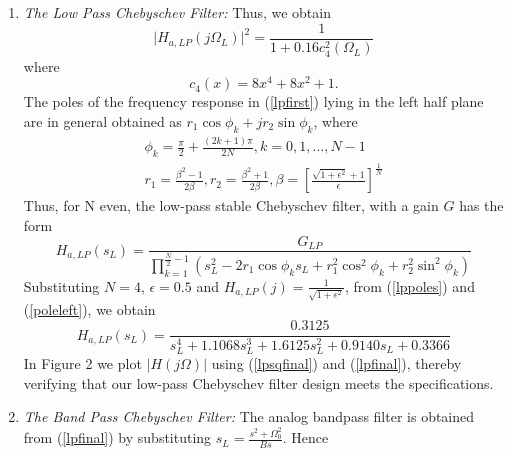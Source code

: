 \documentclass[journal,12pt,twocolumn]{IEEEtran}
\begin{document}
\begin{enumerate}

\item {\em The Low Pass Chebyschev Filter:} Thus, we obtain
\begin{equation}
\label{lpsqfinal}
\vert H_{a,LP}(j\Omega_L)\vert^2 = \frac{1}{1 + 0.16c_4^2(\Omega_L)}
\end{equation}
where
\begin{equation}
c_4(x) = 8x^4 + 8x^2 + 1.	
\end{equation}
The poles of the frequency response in (\ref{lpfirst}) lying in the left half plane are in general obtained as 
$r_1\cos\phi_k + jr_2\sin \phi_k$, where
\begin{eqnarray}
\label{lppoles}
\phi_k = \frac{\pi}{2} + \frac{(2k+1)\pi}{2N}, k = 0, 1, \dots, N-1 \nonumber \\
r_1 = \frac{\beta^2 - 1}{2\beta}, r_2 = \frac{\beta^2 + 1}{2\beta}, \beta = \left[ \frac{\sqrt{1 + \epsilon^2} + 1}{\epsilon}\right]^{\frac{1}{N}}
\end{eqnarray}
Thus, for N even, the low-pass stable Chebyschev filter, with a gain $G$ has the form
\begin{equation}
\label{poleleft}
H_{a,LP}(s_L) = \frac{G_{LP}}{\prod_{k = 1}^{\frac{N}{2}-1}(s_L^2 - 2r_1\cos\phi_ks_L + r_1^2\cos^2\phi_k + r_2^2 \sin^2\phi_k)}
\end{equation}
Substituting $N = 4$, $\epsilon = 0.5$ and $H_{a,LP}(j) = \frac{1}{\sqrt{1+\epsilon^2}}$, from (\ref{lppoles}) and (\ref{poleleft}), we obtain 
\begin{equation}
\label{lpfinal}
H_{a,LP}(s_L) = \frac{0.3125}{s_L^4 + 1.1068s_L^3 + 1.6125s_L^2+0.9140s_L + 0.3366}
\end{equation}
In Figure 2 we plot $|H(j\Omega)|$ using (\ref{lpsqfinal}) and (\ref{lpfinal}), thereby verifying that our low-pass Chebyschev filter design meets the specifications.
\item {\em The Band Pass Chebyschev Filter:}  The analog bandpass filter is obtained from (\ref{lpfinal}) by substituting
$s_L = \frac{s^2 + \Omega_0^2}{Bs}$.  Hence

\end{enumerate}
\end{document}
